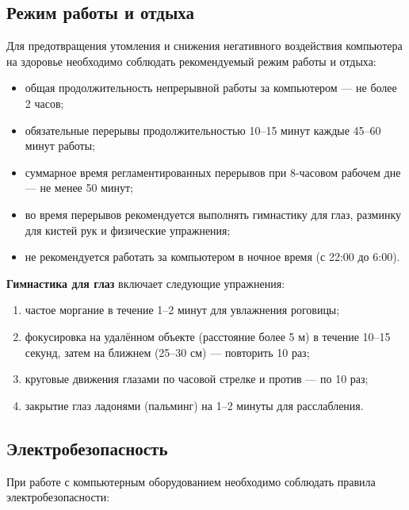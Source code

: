 \documentclass[14pt,a4paper,oneside]{extarticle}
\begin{document}
\subsection{Режим работы и отдыха}

Для предотвращения утомления и снижения негативного воздействия компьютера на здоровье необходимо соблюдать рекомендуемый режим работы и отдыха:

\begin{itemize}[leftmargin=2cm]
    \item общая продолжительность непрерывной работы за компьютером --- не более 2 часов;
    \item обязательные перерывы продолжительностью 10--15 минут каждые 45--60 минут работы;
    \item суммарное время регламентированных перерывов при 8-часовом рабочем дне --- не менее 50 минут;
    \item во время перерывов рекомендуется выполнять гимнастику для глаз, разминку для кистей рук и физические упражнения;
    \item не рекомендуется работать за компьютером в ночное время (с 22:00 до 6:00).
\end{itemize}

\textbf{Гимнастика для глаз} включает следующие упражнения:
\begin{enumerate}[leftmargin=2cm]
    \item частое моргание в течение 1--2 минут для увлажнения роговицы;
    \item фокусировка на удалённом объекте (расстояние более 5 м) в течение 10--15 секунд, затем на ближнем (25--30 см) --- повторить 10 раз;
    \item круговые движения глазами по часовой стрелке и против --- по 10 раз;
    \item закрытие глаз ладонями (пальминг) на 1--2 минуты для расслабления.
\end{enumerate}

\subsection{Электробезопасность}

При работе с компьютерным оборудованием необходимо соблюдать правила электробезопасности:
\end{document}
